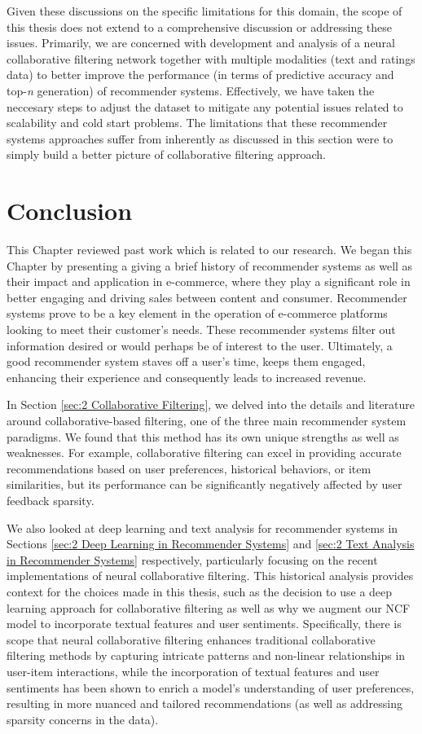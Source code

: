 Given these discussions on the specific limitations for this domain, the scope of this thesis does not extend to a comprehensive discussion or addressing these issues. Primarily, we are concerned with development and analysis of a neural collaborative filtering network together with multiple modalities (text and ratings data) to better improve the performance (in terms of predictive accuracy and top-\textit{n} generation) of recommender systems. Effectively, we have taken the neccesary steps to adjust the dataset to mitigate any potential issues related to scalability and cold start problems. The limitations that these recommender systems approaches suffer from inherently as discussed in this section were to simply build a better picture of collaborative filtering approach.

\section{Conclusion}
\label{sec: Conclusion}

This Chapter reviewed past work which is related to our research. We began this Chapter by presenting a giving a brief history of recommender systems as well as their impact and application in e-commerce, where they play a significant role in better engaging and driving sales between content and consumer. Recommender systems prove to be a key element in the operation of e-commerce platforms looking to meet their customer's needs. These recommender systems filter out information desired or would perhaps be of interest to the user. Ultimately, a good recommender system staves off a user's time, keeps them engaged, enhancing their experience and consequently leads to increased revenue.

In Section \ref{sec:2 Collaborative Filtering}, we delved into the details and literature around collaborative-based filtering, one of the three main recommender system paradigms. We found that this method has its own unique strengths as well as weaknesses. For example, collaborative filtering can excel in providing accurate recommendations based on user preferences, historical behaviors, or item similarities, but its performance can be significantly negatively affected by user feedback sparsity.

We also looked at deep learning and text analysis for recommender systems in Sections \ref{sec:2 Deep Learning in Recommender Systems} and \ref{sec:2 Text Analysis in Recommender Systems} respectively, particularly focusing on the recent implementations of neural collaborative filtering. This historical analysis provides context for the choices made in this thesis, such as the decision to use a deep learning approach for collaborative filtering as well as why we augment our NCF model to incorporate textual features and user sentiments. Specifically, there is scope that neural collaborative filtering enhances traditional collaborative filtering methods by capturing intricate patterns and non-linear relationships in user-item interactions, while the incorporation of textual features and user sentiments has been shown to enrich a model's understanding of user preferences, resulting in more nuanced and tailored recommendations (as well as addressing sparsity concerns in the data).

